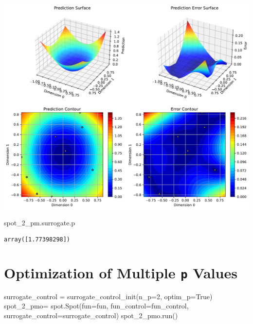 \documentclass[
  letterpaper,
  DIV=11,
  numbers=noendperiod]{scrreprt}
\newenvironment{Shaded}{\begin{snugshade}}{\end{snugshade}}
\newcommand{\DecValTok}[1]{\textcolor[rgb]{0.68,0.00,0.00}{#1}}
\newcommand{\NormalTok}[1]{\textcolor[rgb]{0.00,0.23,0.31}{#1}}
\newcommand{\OperatorTok}[1]{\textcolor[rgb]{0.37,0.37,0.37}{#1}}
\newcommand{\VariableTok}[1]{\textcolor[rgb]{0.07,0.07,0.07}{#1}}
\begin{document}
\includegraphics{015_num_spot_correlation_p_files/figure-pdf/cell-18-output-1.pdf}

\begin{Shaded}
\begin{Highlighting}[]
\NormalTok{spot\_2\_pm.surrogate.p}
\end{Highlighting}
\end{Shaded}

\begin{verbatim}
array([1.77398298])
\end{verbatim}

\section{\texorpdfstring{Optimization of Multiple \texttt{p}
Values}{Optimization of Multiple p Values}}\label{optimization-of-multiple-p-values}

\begin{Shaded}
\begin{Highlighting}[]
\NormalTok{surrogate\_control }\OperatorTok{=}\NormalTok{ surrogate\_control\_init(n\_p}\OperatorTok{=}\DecValTok{2}\NormalTok{,}
\NormalTok{                                           optim\_p}\OperatorTok{=}\VariableTok{True}\NormalTok{)}
\NormalTok{spot\_2\_pmo}\OperatorTok{=}\NormalTok{ spot.Spot(fun}\OperatorTok{=}\NormalTok{fun,}
\NormalTok{                    fun\_control}\OperatorTok{=}\NormalTok{fun\_control,}
\NormalTok{                    surrogate\_control}\OperatorTok{=}\NormalTok{surrogate\_control)}
\NormalTok{spot\_2\_pmo.run()}
\end{Highlighting}
\end{Shaded}
\end{document}

